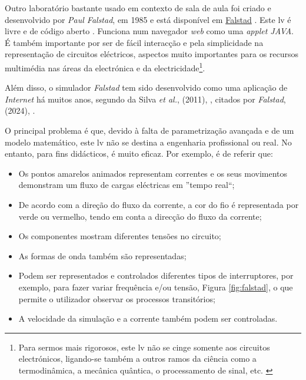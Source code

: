 Outro laboratório bastante usado em contexto de sala de aula foi criado e desenvolvido por \textit{Paul Falstad}, em 1985 e está disponível em \href{www.falstad.com}{Falstad} \cite{falstad}. Este \acrshort{lv} é livre e de código aberto \cite{falstadlicenca}. Funciona num navegador \textit{web} como uma \textit{applet JAVA}. É também importante por ser de fácil interacção e pela simplicidade na representação de circuitos eléctricos, aspectos muito importantes para os recursos multimédia nas áreas da electrónica e da electricidade\footnote{Para sermos mais rigorosos, este \acrshort{lv} não se cinge somente aos circuitos electrónicos, ligando-se também a outros ramos da ciência como a termodinâmica, a mecânica quântica, o processamento de sinal, etc. \cite{falstadcompleto}}.

Além disso, o simulador \textit{Falstad} tem sido desenvolvido como uma aplicação de \textit{Internet} há muitos anos, segundo da Silva \textit{et al.}, (2011), \cite{RemoteTeachingElectricalCircuits}, citados por \textit{Falstad},(2024), \cite{falstad}. 

O principal problema é que, devido à falta de parametrização avançada e de um modelo matemático, este \acrshort{lv} não se destina a engenharia profissional ou real. No entanto, para fins didácticos, é muito eficaz. Por exemplo, é de referir que:
\begin{itemize}
    \item Os pontos amarelos animados representam correntes e os seus movimentos demonstram um fluxo de cargas eléctricas em ''tempo real``;
    \item De acordo com a direção do fluxo da corrente, a cor do fio é representada por verde ou vermelho, tendo em conta a direcção do fluxo da corrente;
    \item Os componentes mostram diferentes tensões no circuito;
    \item As formas de onda também são representadas;
    \item Podem ser representados e controlados diferentes tipos de interruptores, por exemplo, para fazer variar frequência e/ou tensão, Figura \ref{fig:falstad}, o que permite o utilizador observar os processos transitórios;
    \item A velocidade da simulação e a corrente também podem ser controladas.
\end{itemize}

